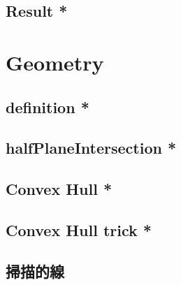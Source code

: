 \documentclass[a4paper,10pt,twocolumn,oneside]{article}
\begin{document}
\subsection{Result *}


\section{Geometry}

% 

\subsection{definition *}


% 

\subsection{halfPlaneIntersection *}

% 

\subsection{Convex Hull *}


\subsection{Convex Hull trick *}


\subsection{掃描的線}


% 
\end{document}
